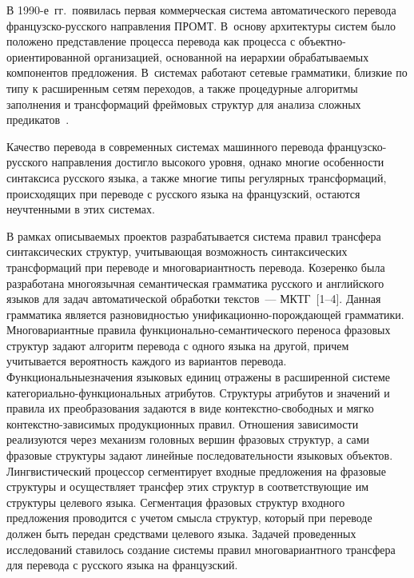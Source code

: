 \begin{multicols}{2}
     В 1990-е~гг.\ появилась первая коммерческая сис\-те\-ма автоматического 
перевода фран\-цуз\-ско-рус\-ско\-го направления \mbox{ПРОМТ}. В~основу 
архитектуры сис\-тем было положено представление процесса перевода как 
процесса с объект\-но-ориен\-ти\-ро\-ван\-ной организацией, основанной на 
иерархии обрабатываемых компонентов предложения. В~сис\-те\-мах работают 
сетевые грамматики, близкие по типу к расширенным сетям переходов, а 
также процедурные алгоритмы заполнения и трансформаций фреймовых 
структур для анализа сложных предикатов~\cite{15-mor}.
     
     Качество перевода в современных сис\-те\-мах машинного перевода 
фран\-цуз\-ско-рус\-ско\-го направления достигло высокого уровня, однако 
многие особенности синтаксиса русского языка, а также \mbox{многие} типы 
регулярных трансформаций, происходящих при переводе с русского языка на 
французский, остаются неучтенными в этих сис\-темах. 
     
     В рамках описываемых проектов разрабатывается сис\-те\-ма правил 
трансфера синтаксических структур, учитывающая возможность 
синтаксических трансформаций при переводе и многовариантность перевода. 
Козеренко была разработана многоязычная семантическая грамматика 
русского и английского языков для задач автоматической обработки 
текстов~--- МКТГ~[1--4]. Данная грамматика является разновидностью 
уни\-фи\-ка\-ци\-он\-но-по\-рож\-да\-ющей грамматики. Многовариантные правила 
функ\-ци\-о\-наль\-но-се\-ман\-ти\-че\-ско\-го переноса фразовых структур 
задают алгоритм перевода с одного языка на другой, причем учитывается 
вероятность каждого из вариантов перевода. Функциональные\linebreak значения 
языковых единиц отражены в рас\-ши\-ренной сис\-те\-ме ка\-те\-го\-ри\-аль\-но-функ\-ци\-о\-наль\-ных 
ат\-рибутов. Структуры атрибутов и значений и правила
их преобразования задаются в виде кон\-текст\-но-сво\-бод\-ных и мягко 
     кон\-текст\-но-за\-ви\-си\-мых продукционных правил. Отношения 
зависимости реализуются через механизм головных вершин фразовых 
структур, а сами фразовые структуры задают линейные последовательности 
языковых объектов. Лингвистический процессор сегментирует входные 
предложения на фразовые структуры и осуществляет трансфер этих структур 
в соответствующие им структуры целевого языка. Сегментация фразовых 
структур входного предложения проводится с учетом смысла структур, 
который при переводе должен быть передан средствами целевого языка. 
Задачей проведенных исследований ставилось создание сис\-те\-мы правил 
многовариантного трансфера для перевода с русского языка на французский.
     

\end{multicols}
